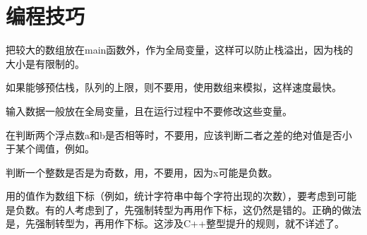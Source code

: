\chapter{编程技巧}
把较大的数组放在main函数外，作为全局变量，这样可以防止栈溢出，因为栈的大小是有限制的。

如果能够预估栈，队列的上限，则不要用，使用数组来模拟，这样速度最快。

输入数据一般放在全局变量，且在运行过程中不要修改这些变量。

在判断两个浮点数a和b是否相等时，不要用，应该判断二者之差的绝对值是否小于某个阈值，例如。

判断一个整数是否是为奇数，用，不要用，因为x可能是负数。

用的值作为数组下标（例如，统计字符串中每个字符出现的次数），要考虑到可能是负数。有的人考虑到了，先强制转型为再用作下标，这仍然是错的。正确的做法是，先强制转型为，再用作下标。这涉及C++整型提升的规则，就不详述了。
